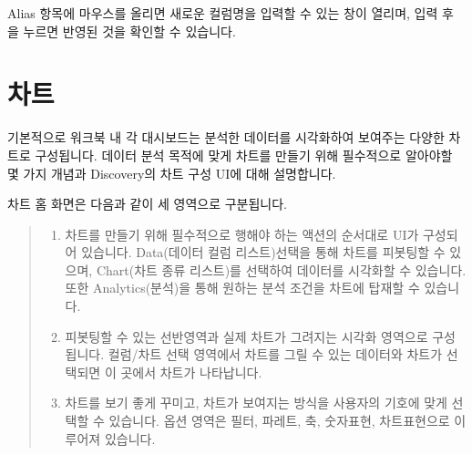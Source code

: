 \documentclass[letterpaper,10pt,english]{sphinxmanual}
\begin{document}
Alias 항목에 마우스를 올리면 새로운 컬럼명을 입력할 수 있는 창이 열리며, 입력 후 을 누르면 반영된 것을 확인할 수 있습니다.
\begin{quote}

\begin{figure}[H]
\centering

\noindent{}
\end{figure}
\end{quote}


\section{차트}
\label{\detokenize{discovery/part04/manage_charts:id1}}\label{\detokenize{discovery/part04/manage_charts::doc}}
기본적으로 워크북 내 각 대시보드는 분석한 데이터를 시각화하여 보여주는 다양한 차트로 구성됩니다. 데이터 분석 목적에 맞게 차트를 만들기 위해 필수적으로 알아야할 몇 가지 개념과 Discovery의 차트 구성 UI에 대해 설명합니다.

차트 홈 화면은 다음과 같이 세 영역으로 구분됩니다.
\begin{quote}

\begin{figure}[H]
\centering

\noindent{}
\end{figure}
\begin{enumerate}
\def\theenumi{\arabic{enumi}}
\def\labelenumi{\theenumi .}
\makeatletter\def\p@enumii{\p@enumi \theenumi .}\makeatother
\item {} 
 차트를 만들기 위해 필수적으로 행해야 하는 액션의 순서대로 UI가 구성되어 있습니다. Data(데이터 컬럼 리스트)선택을 통해 차트를 피봇팅할 수 있으며, Chart(차트 종류 리스트)를 선택하여 데이터를 시각화할 수 있습니다. 또한 Analytics(분석)을 통해 원하는 분석 조건을 차트에 탑재할 수 있습니다.

\item {} 
 피봇팅할 수 있는 선반영역과 실제 차트가 그려지는 시각화 영역으로 구성됩니다. 컬럼/차트 선택 영역에서 차트를 그릴 수 있는 데이터와 차트가 선택되면 이 곳에서 차트가 나타납니다.

\item {} 
 차트를 보기 좋게 꾸미고, 차트가 보여지는 방식을 사용자의 기호에 맞게 선택할 수 있습니다. 옵션 영역은 필터, 파레트, 축, 숫자표현, 차트표현으로 이루어져 있습니다.

\end{enumerate}
\end{quote}
\end{document}

